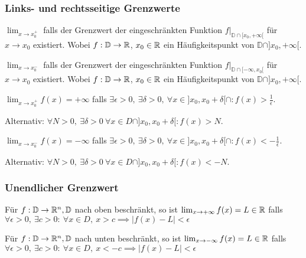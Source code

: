 \subsubsection{Links- und rechtsseitige Grenzwerte}
\begin{compactdesc}
    \item[Rechtsseitiger Grenzwert:] $\lim_{x \to x_0^+}$ falls der Grenzwert der eingeschränkten Funktion $f|_{\mathbb{D} \cap [x_0, +\infty[}$ für $x \to x_0$ existiert. Wobei $f:\mathbb{D} \to \mathbb{R}$, $x_0 \in \mathbb{R}$ ein Häufigkeitspunkt von $\mathbb{D} \cap ]x_0, + \infty[$.
    \item[Linksseitiger Grenzwert:] $\lim_{x \to x_0^-}$ falls der Grenzwert der eingeschränkten Funktion $f|_{\mathbb{D} \cap [-\infty, x_0[}$ für $x \to x_0$ existiert. Wobei $f:\mathbb{D} \to \mathbb{R}$, $x_0 \in \mathbb{R}$ ein Häufigkeitspunkt von $\mathbb{D} \cap ]x_0, + \infty[$.
    \item[Erweitert Rechts:] $\lim_{x \to x_0^+} f(x) = +\infty$ falls $\exists \epsilon > 0, \ \exists \delta > 0, \ \forall x \in ]x_0, x_0 + \delta[ \cap : f(x) > \frac{1}{\epsilon}$.
        \begin{compactitem}
        \item Alternativ: $\forall N > 0, \ \exists \delta > 0 \ \forall x \in D \cap ]x_0, x_0 + \delta[ : f(x) > N$.
        \end{compactitem}
    \item[Erweitert Links:] $\lim_{x \to x_0^-} f(x) = -\infty$ falls $\exists \epsilon > 0, \ \exists \delta > 0, \ \forall x \in ]x_0, x_0 + \delta[ \cap : f(x) < -\frac{1}{\epsilon}$.
        \begin{compactitem}
        \item Alternativ: $\forall N > 0, \ \exists \delta > 0 \ \forall x \in D \cap ]x_0, x_0 + \delta[ : f(x) < -N$.
        \end{compactitem}
\end{compactdesc}

\subsubsection{Unendlicher Grenzwert}
\begin{compactdesc}
    \item[Oben:] Für $f: \mathbb{D} \to \mathbb{R}^n, \mathbb{D}$ nach oben beschränkt, so ist $\lim_{x \to +\infty} f(x) = L \in \mathbb{R}$ falls $\forall \epsilon > 0, \ \exists c > 0: \ \forall x \in D, \ x > c \implies |f(x) - L| < \epsilon$
    \item[Unten] Für $f: \mathbb{D} \to \mathbb{R}^n, \mathbb{D}$ nach unten beschränkt, so ist $\lim_{x \to -\infty} f(x) = L \in \mathbb{R}$ falls $\forall \epsilon > 0, \ \exists c > 0: \ \forall x \in D, \ x < -c \implies |f(x) - L| < \epsilon$
\end{compactdesc}
